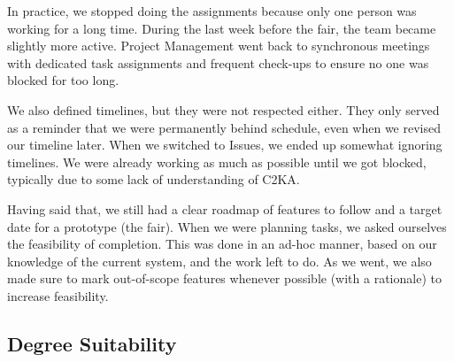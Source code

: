 In practice, we stopped doing the assignments because only one person was working for a long time.
During the last week before the fair, the team became slightly more active.
Project Management went back to synchronous meetings with dedicated task assignments and frequent check-ups to ensure no one was blocked for too long.

We also defined timelines, but they were not respected either.
They only served as a reminder that we were permanently behind schedule, even when we revised our timeline later.
When we switched to Issues, we ended up somewhat ignoring timelines.
We were already working as much as possible until we got blocked, typically due to some lack of understanding of C2KA\@.

Having said that, we still had a clear roadmap of features to follow and a target date for a prototype (the fair).
When we were planning tasks, we asked ourselves the feasibility of completion.
This was done in an ad-hoc manner, based on our knowledge of the current system, and the work left to do.
As we went, we also made sure to mark out-of-scope features whenever possible (with a rationale) to increase feasibility.

\subsection{Degree Suitability}\label{subsec:deg-suit}

